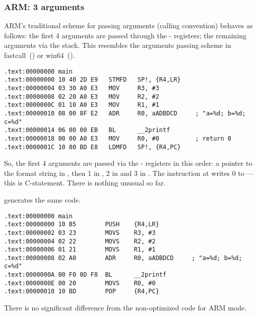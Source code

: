 \subsubsection{ARM: 3 arguments}

ARM's traditional scheme for passing arguments (calling convention) behaves as follows:
the first 4 arguments are passed through the - registers; the remaining arguments via the stack.
This resembles the arguments passing scheme in 
fastcall~() or win64~().


\mysubparagraph{\NonOptimizingKeilVI (\ARMMode)}

\begin{lstlisting}[caption=\NonOptimizingKeilVI (\ARMMode)]
.text:00000000 main
.text:00000000 10 40 2D E9   STMFD   SP!, {R4,LR}
.text:00000004 03 30 A0 E3   MOV     R3, #3
.text:00000008 02 20 A0 E3   MOV     R2, #2
.text:0000000C 01 10 A0 E3   MOV     R1, #1
.text:00000010 08 00 8F E2   ADR     R0, aADBDCD     ; "a=%d; b=%d; c=%d"
.text:00000014 06 00 00 EB   BL      __2printf
.text:00000018 00 00 A0 E3   MOV     R0, #0          ; return 0
.text:0000001C 10 80 BD E8   LDMFD   SP!, {R4,PC}
\end{lstlisting}

So, the first 4 arguments are passed via the - registers in this order:
a pointer to the \printf format string in 
, then 1 in , 2 in  and 3 in .
The instruction at  writes 0 to ---this is  C-statement.
There is nothing unusual so far.

\OptimizingKeilVI generates the same code.

\mysubparagraph{\OptimizingKeilVI (\ThumbMode)}

\begin{lstlisting}[caption=\OptimizingKeilVI (\ThumbMode)]
.text:00000000 main
.text:00000000 10 B5        PUSH    {R4,LR}
.text:00000002 03 23        MOVS    R3, #3
.text:00000004 02 22        MOVS    R2, #2
.text:00000006 01 21        MOVS    R1, #1
.text:00000008 02 A0        ADR     R0, aADBDCD     ; "a=%d; b=%d; c=%d"
.text:0000000A 00 F0 0D F8  BL      __2printf
.text:0000000E 00 20        MOVS    R0, #0
.text:00000010 10 BD        POP     {R4,PC}
\end{lstlisting}

There is no significant difference from the non-optimized code for ARM mode.

